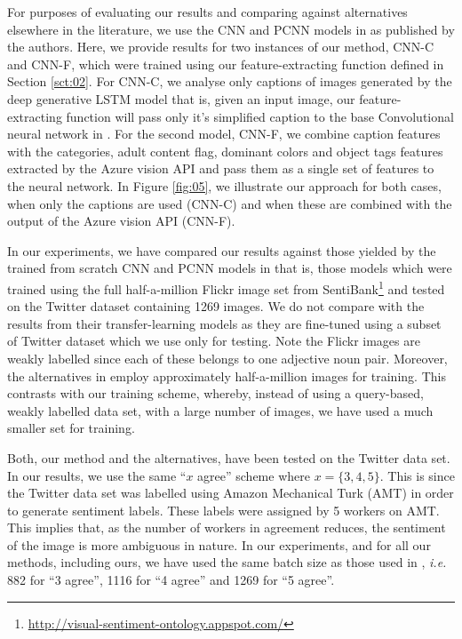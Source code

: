 \documentclass[12pt,a4paper]{article}
\begin{document}
For purposes of evaluating our results and comparing against alternatives elsewhere in the literature, we use the CNN and PCNN models in \cite{You:2015} as published by the authors. Here, we provide results for two instances of our method, CNN-C and CNN-F, which were trained using our feature-extracting function defined in Section \ref{sct:02}. For CNN-C, we analyse only captions of images generated by the deep generative LSTM model \cite{Vinyals:2016} that is, given an input image, our feature-extracting function will pass only it's simplified caption to the base Convolutional neural network %
in \cite{Kim:2014}. For the second model, CNN-F, we combine caption features with the categories, adult content flag, dominant colors and object tags features extracted by the Azure vision API and pass them as a single set of features to the neural network.    %
In Figure \ref{fig:05}, we illustrate our approach for both cases, when only the captions are used (CNN-C) and when these are combined with the output of the Azure vision API (CNN-F).
\vspace{2mm}

In our experiments, we have compared our results against those yielded by the trained from scratch CNN and PCNN models in \cite{You:2015} that is, those models which were trained using the full half-a-million Flickr image set from SentiBank\footnote{\url{http://visual-sentiment-ontology.appspot.com/}} and tested on the Twitter dataset containing 1269 images. We do not compare with the results from their transfer-learning models as they are fine-tuned using a subset of Twitter dataset which we use only for testing. Note the Flickr images are weakly labelled since each of these belongs to one adjective noun pair. Moreover, the alternatives in \cite{You:2015} employ approximately half-a-million images for training. This contrasts with our training scheme, whereby, instead of using a query-based, weakly labelled data set, with a large number of images, we have used a much smaller set for training.
\vspace{2mm}

Both, our method and the alternatives, have been tested on the Twitter data set. In our results, we use the same ``$x$ agree'' scheme where $x=\{3,4,5\}$. This is since the Twitter data set was labelled using Amazon Mechanical Turk (AMT) in order to generate sentiment labels. These labels were assigned by 5 workers on AMT. This implies that, as the number of workers in agreement reduces, the sentiment of the image is more ambiguous in nature. In our experiments, and for all our methods, including ours, we have used the same batch size as those used in \cite{You:2015}, {\it i.e.} 882 for ``3 agree'', 1116 for ``4 agree'' and 1269 for ``5 agree''.
\vspace{2mm}
\end{document}

